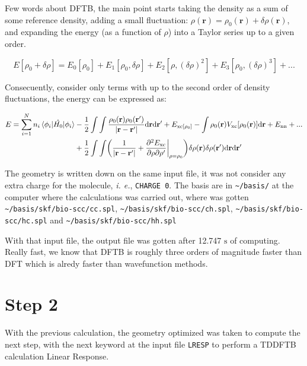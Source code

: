 Few words about DFTB, the main point starts taking the density as a sum of some
reference density, adding a small fluctuation: $\rho (\mathbf{r}) =
\rho_0(\mathbf{r}) + \delta\rho (\mathbf{r})$, and expanding the energy (as a
function of $\rho$) into a Taylor series up to a given order.

$$
E[\rho_0 + \delta\rho ] = E_0[\rho_0] + E_1[\rho_0, \delta\rho] + E_2[\rho, (\delta\rho)^2] +
E_3[\rho_0, (\delta\rho)^3] + ...
$$

Consecuently, consider only terms with up to the second order of density fluctuations, the
energy can be expressed as:

\begin{equation}
\begin{split}
E = \sum_{i=1}^N n_i \expval{\hat{H_0}}{\phi_i}
&-\frac12\int\int\frac{\rho_0(\mathbf{r})\rho_0(\mathbf{r'})}{|\mathbf{r}-\mathbf{r'}|}
\dd \mathbf{r}\dd \mathbf{r'}
+E_{\mathrm{xc}[\rho_0]}
-\int\rho_0(\mathbf{r})V_{\mathrm{xc}}[\rho_0(\mathbf{r})]\dd\mathbf{r}
+E_{\mathrm{nn}}+ ...\\\nonumber
&+\frac12\int\int\biggl(\frac1{|\mathbf{r}-\mathbf{r'}|}+\pdv{E_{\mathrm{xc}}}{\rho}{\rho'}\biggr |_{\rho=\rho_0} \biggr)
\delta\rho(\mathbf{r})\delta\rho(\mathbf{r'})\dd\mathbf{r}\dd\mathbf{r'}\nonumber
\end{split}
\end{equation}

The geometry is written down on the same input file, it was not consider any extra
charge for the molecule, \textit{i. e.}, \texttt{CHARGE 0}. The basis are in
\texttt{\textasciitilde /basis/} at the computer where the calculations was carried out, where
was gotten \texttt{\textasciitilde /basis/skf/bio-scc/cc.spl},
\texttt{\textasciitilde /basis/skf/bio-scc/ch.spl}, \newline \texttt{\textasciitilde /basis/skf/bio-scc/hc.spl} and
\texttt{\textasciitilde /basis/skf/bio-scc/hh.spl}

With that input file, the output file was gotten after 12.747 $\mathrm{s}$ of
computing. Really fast, we know that DFTB is roughly three orders of magnitude
faster than DFT which is alredy faster than wavefunction methods.

\section{\textbf{Step 2}}

With the previous calculation, the geometry optimized was taken to compute the
next step,  with the next keyword at the input file \texttt{LRESP} to perform a TDDFTB
calculation Linear Response.

